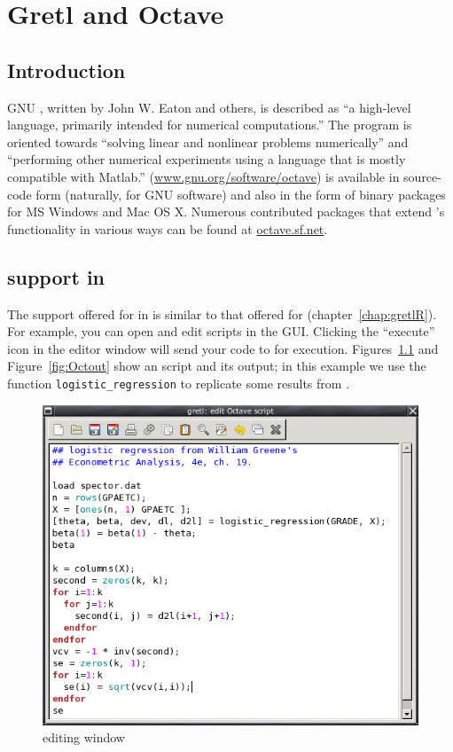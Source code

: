 \chapter{Gretl and Octave}
\label{chap:gretlOctave}

\section{Introduction}
\label{Octave-intro}

GNU , written by John W. Eaton and others, is described as
``a high-level language, primarily intended for numerical
computations.''  The program is oriented towards ``solving linear and
nonlinear problems numerically'' and ``performing other numerical
experiments using a language that is mostly compatible with Matlab.''
(\url{www.gnu.org/software/octave})  is available in
source-code form (naturally, for GNU software) and also in the form of
binary packages for MS Windows and Mac OS X.  Numerous contributed
packages that extend 's functionality in various ways can
be found at \url{octave.sf.net}.


\section{ support in }
\label{sec:Octave-support}

The support offered for  in  is similar to that
offered for  (chapter~\ref{chap:gretlR}).  For example, you can
open and edit  scripts in the  GUI.  Clicking
the ``execute'' icon in the editor window will send your code to
 for execution.  Figures~\ref{fig:Octedit} and
Figure~\ref{fig:Octout} show an  script and its output; in
this example we use the function \verb|logistic_regression| to
replicate some results from \cite{greene00}.

\begin{figure}[htbp]
  \centering
  \includegraphics[scale=0.7]{figures/Octedit}
  \caption{ editing window}
  \label{fig:Octedit}
\end{figure}

